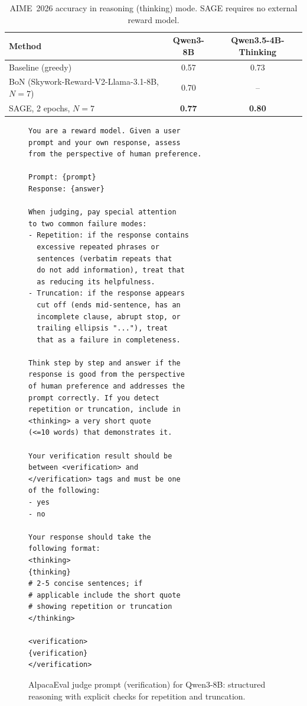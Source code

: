 \documentclass[11pt]{article}
\theoremstyle{plain}
\theoremstyle{definition}
\theoremstyle{remark}
\newcommand{\method}{SAGE}
\begin{document}
\begin{table}[h]
\centering
\begin{small}
\begin{sc}
\begin{tabular}{lcc}
\toprule
\textbf{Method} & \textbf{Qwen3-8B} & \textbf{Qwen3.5-4B-Thinking} \\
\midrule
Baseline (greedy) & 0.57 & 0.73 \\
BoN (Skywork-Reward-V2-Llama-3.1-8B, $N=7$) & 0.70 & -- \\
\method{}, 2 epochs, $N=7$ & \textbf{0.77} & \textbf{0.80} \\
\bottomrule
\end{tabular}
\end{sc}
\end{small}
\caption{AIME~2026 accuracy in reasoning (thinking) mode. \method{} requires no external reward model.}
\label{tab:aime2026}
\end{table}



\begin{figure}[h]
\centering
\begin{minipage}{\linewidth}
\begin{small}
\begin{verbatim}
You are a reward model. Given a user
prompt and your own response, assess
from the perspective of human preference.

Prompt: {prompt}
Response: {answer}

When judging, pay special attention
to two common failure modes:
- Repetition: if the response contains
  excessive repeated phrases or
  sentences (verbatim repeats that
  do not add information), treat that
  as reducing its helpfulness.
- Truncation: if the response appears
  cut off (ends mid-sentence, has an
  incomplete clause, abrupt stop, or
  trailing ellipsis "..."), treat
  that as a failure in completeness.

Think step by step and answer if the
response is good from the perspective
of human preference and addresses the
prompt correctly. If you detect
repetition or truncation, include in
<thinking> a very short quote
(<=10 words) that demonstrates it.

Your verification result should be
between <verification> and
</verification> tags and must be one
of the following:
- yes
- no

Your response should take the
following format:
<thinking>
{thinking}
# 2-5 concise sentences; if
# applicable include the short quote
# showing repetition or truncation
</thinking>

<verification>
{verification}
</verification>
\end{verbatim}
\end{small}
\end{minipage}
\caption{AlpacaEval judge prompt (verification) for Qwen3-8B: structured reasoning with explicit checks for repetition and truncation.}
\label{fig:appendix-qwen-alpaca-judge-verify}
\end{figure}
\end{document}
